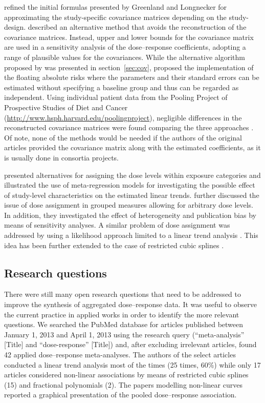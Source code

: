 \documentclass[11pt,a4paper,twoside,openany]{book}\usepackage{knitr}
\begin{document}
{\cite{orsini2006generalized} refined the initial formulas presented by Greenland and Longnecker for approximating the study-specific covariance matrices depending on the study-design. \cite{berrington2003generalized} described an alternative method that avoids the reconstruction of the covariance matrices. Instead, upper and lower bounds for the covariance matrix are used in a sensitivity analysis of the dose--response coefficients, adopting a range of plausible values for the covariances. While the alternative algorithm proposed by \cite{hamling2008facilitating} was presented in section~\ref{sec:cov}, \cite{easton1991floating} proposed the implementation of the floating absolute risks where the parameters and their standard errors can be estimated without specifying a baseline group and thus can be regarded as independent. Using individual patient data from the Pooling Project of Prospective Studies of Diet and Cancer (\url{http://www.hsph.harvard.edu/poolingproject}), negligible differences in the reconstructed covariance matrices were found comparing the three approaches \citep{orsini2011meta}. Of note, none of the methods would be needed if the authors of the original articles provided the covariance matrix along with the estimated coefficients, as it is usually done in consortia projects.

\cite{berlin1993meta} presented alternatives for assigning the dose levels within exposure categories and illustrated the use of meta-regression models for investigating the possible effect of study-level characteristics on the estimated linear trends. \cite{shi2004meta} further discussed the issue of dose assignment in grouped measures allowing for arbitrary dose levels. In addition, they investigated the effect of heterogeneity and publication bias by means of sensitivity analyses. A similar problem of dose assignment was addressed by using a likelihood approach limited to a linear trend analysis \citep{takahashi2010assignment}. This idea has been further extended to the case of restricted cubic splines \citep{takahashi2013cubic}.

\subsection{Research questions}

There were still many open research questions that need to be addressed to improve the synthesis of aggregated dose--response data. It was useful to observe the current practice in applied works in order to identify the more relevant questions. We searched the PubMed database for articles published between January 1, 2013 and April 1, 2013 using the research query (``meta-analysis'' [Title] and ``dose-response'' [Title]) and, after excluding irrelevant articles, found 42 applied dose--response meta-analyses. The authors of the select articles conducted a linear trend analysis most of the times (25 times, 60\%) while only 17 articles considered non-linear associations by means of restricted cubic splines (15) and fractional polynomials (2). The papers modelling non-linear curves reported a graphical presentation of the pooled dose--response association.

}
\end{document}
